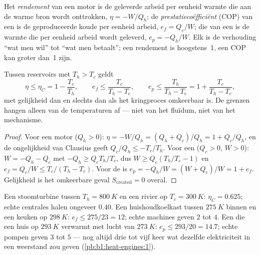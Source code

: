 \begin{definition}\label{def:b1:heat-engines:efficiency}
Het \emph{rendement} van een motor is de geleverde arbeid per eenheid warmte
die aan de warme bron wordt onttrokken, $\eta = -W/Q_h$; de
\emph{prestatiecoëfficiënt} (COP) van een  is de geproduceerde koude
per eenheid arbeid, $e_f = Q_c/W$; die van een  is de warmte
die per eenheid arbeid wordt geleverd, $e_p = -Q_h/W$. Elk is de verhouding ``wat men
wil'' tot ``wat men betaalt''; een rendement is hoogstens~1, een COP kan
groter dan~1 zijn.
\end{definition}

\begin{theorem}[Carnot]\label{thm:b1:heat-engines:carnot}
Tussen reservoirs met $T_h > T_c$ geldt
\[
\eta \leq \eta_C = 1 - \frac{T_c}{T_h}, \qquad
e_f \leq \frac{T_c}{T_h - T_c}, \qquad
e_p \leq \frac{T_h}{T_h - T_c} = 1 + \frac{T_c}{T_h - T_c},
\]
met gelijkheid dan en slechts dan als het kringproces omkeerbaar is. De grenzen hangen
alleen van de temperaturen af --- niet van het fluïdum, niet van het mechanisme.
\end{theorem}

\begin{proof}
Voor een motor ($Q_h > 0$): $\eta = -W/Q_h = (Q_h + Q_c)/Q_h = 1 + Q_c/Q_h$,
en de ongelijkheid van Clausius geeft $Q_c/Q_h \leq -T_c/T_h$. Voor een
 ($Q_c > 0$, $W > 0$): $W = -Q_h - Q_c$ met $-Q_h \geq Q_c T_h/T_c$,
dus $W \geq Q_c(T_h/T_c - 1)$ en $e_f = Q_c/W \leq T_c/(T_h - T_c)$.
Voor de  is $e_p = -Q_h/W = (W + Q_c)/W = 1 + e_f$. Gelijkheid is
het omkeerbare geval $S_{\mathrm{created}} = 0$ overal.
\end{proof}

\begin{example}\label{ex:b1:heat-engines:numbers}
Een stoomturbine tussen $T_h = \qty{800}{K}$ en een rivier op
$T_c = \qty{300}{K}$: $\eta_C = 0.625$; echte centrales halen ongeveer $0.40$.
Een huishoudkoelkast tussen $\qty{275}{K}$ binnen en een keuken op
$\qty{298}{K}$: $e_f \leq 275/23 = 12$; echte machines geven $2$ tot $4$. Een
 die een huis op $\qty{293}{K}$ verwarmt met lucht van $\qty{273}{K}$:
$e_p \leq 293/20 = 14.7$; echte pompen geven $3$ tot $5$ --- nog altijd drie tot
vijf keer wat dezelfde elektriciteit in een weerstand zou geven
(\cref{pb:b1:heat-engines:1}).
\end{example}

